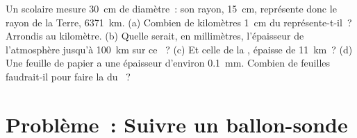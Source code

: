 \begin{exercise}[$\star\star\star$]\label{exo:g8:the-atmosphere:12}
Un  scolaire mesure \qty{30}{cm} de diamètre~: son rayon,
\qty{15}{cm}, représente donc le rayon de la Terre, \qty{6371}{km}. (a)
Combien de kilomètres \qty{1}{cm} du  représente-t-il~? Arrondis au
kilomètre. (b) Quelle serait, en millimètres, l'épaisseur de l'atmosphère
jusqu'à \qty{100}{km} sur ce ~? (c) Et celle de la ,
épaisse de \qty{11}{km}~? (d) Une feuille de papier a une épaisseur
d'environ \qty{0.1}{mm}. Combien de feuilles faudrait-il pour faire la
 du ~?
\end{exercise}

\section{Problème~: Suivre un ballon-sonde}


